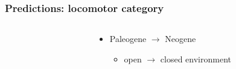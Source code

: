 \documentclass{beamer} \usepackage{amsmath,amsthm}
\begin{document}
\begin{frame}
  \frametitle{Predictions: locomotor category}
  
  \begin{columns}
    \begin{column}{0.5\textwidth}
    \end{column}
    \begin{column}{0.5\textwidth}
      \begin{itemize}
        \item Paleogene \(\to\) Neogene
          \begin{itemize}
            \item open \(\to\) closed environment
          \end{itemize}
      \end{itemize}
    \end{column}
  \end{columns}
\end{frame}
\end{document}
